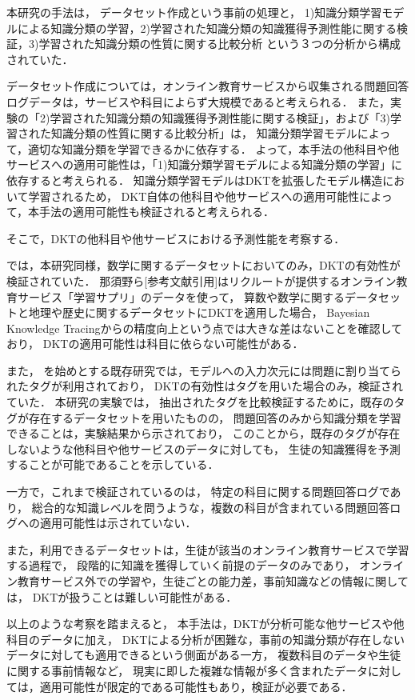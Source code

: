 本研究の手法は，
データセット作成という事前の処理と，
1)知識分類学習モデルによる知識分類の学習，2)学習された知識分類の知識獲得予測性能に関する検証，3)学習された知識分類の性質に関する比較分析
という３つの分析から構成されていた．

データセット作成については，オンライン教育サービスから収集される問題回答ログデータは，サービスや科目によらず大規模であると考えられる．
また，実験の「2)学習された知識分類の知識獲得予測性能に関する検証」，および「3)学習された知識分類の性質に関する比較分析」は，
知識分類学習モデルによって，適切な知識分類を学習できるかに依存する．
よって，本手法の他科目や他サービスへの適用可能性は，「1)知識分類学習モデルによる知識分類の学習」に依存すると考えられる．
知識分類学習モデルはDKTを拡張したモデル構造において学習されるため，
DKT自体の他科目や他サービスへの適用可能性によって，本手法の適用可能性も検証されると考えられる．


そこで，DKTの他科目や他サービスにおける予測性能を考察する．

\cite{piech2015deep}では，本研究同様，数学に関するデータセットにおいてのみ，DKTの有効性が検証されていた．
那須野ら[参考文献引用]はリクルートが提供するオンライン教育サービス「学習サプリ」のデータを使って，
算数や数学に関するデータセットと地理や歴史に関するデータセットにDKTを適用した場合，
Bayesian Knowledge Tracingからの精度向上という点では大きな差はないことを確認しており，
DKTの適用可能性は科目に依らない可能性がある．

また，
\cite{piech2015deep}を始めとする既存研究では，モデルへの入力次元には問題に割り当てられたタグが利用されており，
DKTの有効性はタグを用いた場合のみ，検証されていた．
本研究の実験では，
抽出されたタグを比較検証するために，既存のタグが存在するデータセットを用いたものの，
問題回答のみから知識分類を学習できることは，実験結果から示されており，
このことから，既存のタグが存在しないような他科目や他サービスのデータに対しても，
生徒の知識獲得を予測することが可能であることを示している．


一方で，これまで検証されているのは，
特定の科目に関する問題回答ログであり，
総合的な知識レベルを問うような，複数の科目が含まれている問題回答ログへの適用可能性は示されていない．

また，利用できるデータセットは，生徒が該当のオンライン教育サービスで学習する過程で，
段階的に知識を獲得していく前提のデータのみであり，
オンライン教育サービス外での学習や，生徒ごとの能力差，事前知識などの情報に関しては，
DKTが扱うことは難しい可能性がある．


以上のような考察を踏まえると，
本手法は，DKTが分析可能な他サービスや他科目のデータに加え，
DKTによる分析が困難な，事前の知識分類が存在しないデータに対しても適用できるという側面がある一方，
複数科目のデータや生徒に関する事前情報など，
現実に即した複雑な情報が多く含まれたデータに対しては，適用可能性が限定的である可能性もあり，検証が必要である．


